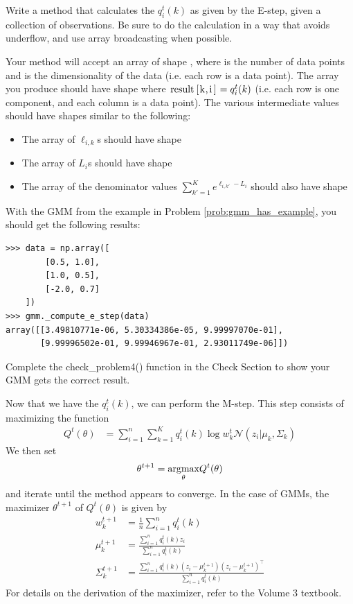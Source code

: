 \begin{problem}
\label{gmm:prob:estep}
Write a method  that calculates the \(q_i^t(k)\) as given by the E-step, given a collection of observations.
Be sure to do the calculation in a way that avoids underflow, and use array broadcasting when possible.

Your method will accept an array of shape , where  is the number of data points and  is the dimensionality of the data (i.e. each row is a data point).
The array you produce should have shape  where \(\text{\li{result[k,i]}} = q_i^t(k)\) (i.e. each row is one component, and each column is a data point).
The various intermediate values should have shapes similar to the following:
\begin{itemize}
\item The array of \(\ell_{i,k}\)s should have shape 
\item The array of \(L_i\)s should have shape 
\item The array of the denominator values \(\sum_{k'=1}^K
e^{\ell_{i,k'}-L_i}\) should also have shape 
\end{itemize}

\noindent
With the GMM from the example in Problem \ref{prob:gmm_has_example}, you should get the following results:
\begin{lstlisting}
>>> data = np.array([
        [0.5, 1.0],
        [1.0, 0.5],
        [-2.0, 0.7]
    ])
>>> gmm._compute_e_step(data)
array([[3.49810771e-06, 5.30334386e-05, 9.99997070e-01],
       [9.99996502e-01, 9.99946967e-01, 2.93011749e-06]])
\end{lstlisting}

Complete the check\_problem4() function in the Check Section to show your GMM gets the correct result.
\end{problem}

Now that we have the \(q_i^t(k)\), we can perform the M-step.
This step consists of maximizing the function
\begin{align*}
Q^t(\theta)
&=\sum_{i=1}^n
\sum_{k=1}^K
q_i^t(k)\log w_k^t\mathcal{N}(z_i| \mu_k,\Sigma_k)
\end{align*}
We then set 
\[
\theta^{t+1}=\underset{\theta}{\mbox{argmax}} Q^t(\theta)
\]
and iterate until the method appears to converge.
In the case of GMMs, the maximizer \(\theta^{t+1}\) of \(Q^t(\theta)\) is given by
\begin{align*}
w_k^{t+1}&=\frac{1}{n}\sum_{i=1}^n q_i^t(k) \\
\mu_k^{t+1}
&=
\frac{\sum_{i=1}^n q_i^t(k) z_i}{\sum_{i=1}^n q_i^t(k)}
\\
\Sigma_k^{t+1}
&=
\frac{\sum_{i=1}^n q_i^t(k) (z_i-\mu_k^{t+1})(z_i-\mu_k^{t+1})^\top}{\sum_{i=1}^n q_i^t(k)}
\end{align*}
For details on the derivation of the maximizer, refer to the Volume 3 textbook.

